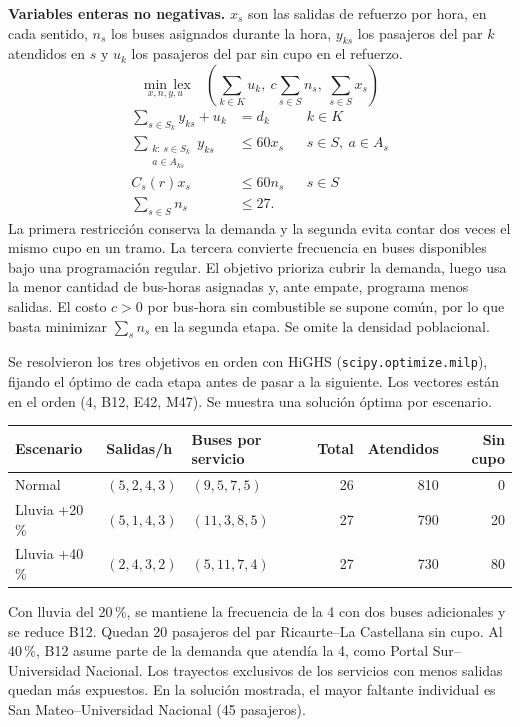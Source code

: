 \documentclass[11pt,letterpaper]{article}
\newcommand{\apartado}[1]{\par\vspace{3pt}{\sffamily\bfseries\color{azul}#1}\par\vspace{1pt}}
\begin{document}
\textbf{Variables enteras no negativas.} $x_s$ son las salidas de refuerzo por hora, en cada sentido, $n_s$ los buses asignados durante la hora, $y_{ks}$ los pasajeros del par $k$ atendidos en $s$ y $u_k$ los pasajeros del par sin cupo en el refuerzo.
\[
\underset{x,n,y,u}{\min\,\mathrm{lex}}\quad
\left(\sum_{k\in K} u_k,\ c\sum_{s\in S} n_s,\ \sum_{s\in S} x_s\right)
\]
\begin{align*}
\sum_{s\in S_k}y_{ks}+u_k &= d_k && k\in K\\
\sum_{\substack{k:\,s\in S_k\\ a\in A_{ks}}} y_{ks}&\le 60x_s && s\in S,\ a\in A_s\\
C_s(r)x_s&\le 60n_s &&s\in S\\
\sum_{s\in S} n_s&\le 27.
\end{align*}
La primera restricción conserva la demanda y la segunda evita contar dos veces el mismo cupo en un tramo. La tercera convierte frecuencia en buses disponibles bajo una programación regular. El objetivo prioriza cubrir la demanda, luego usa la menor cantidad de bus-horas asignadas y, ante empate, programa menos salidas. El costo $c>0$ por bus-hora sin combustible se supone común, por lo que basta minimizar $\sum_s n_s$ en la segunda etapa. Se omite la densidad poblacional.

\apartado{Solución y sensibilidad}
Se resolvieron los tres objetivos en orden con HiGHS (\texttt{scipy.optimize.milp}), fijando el óptimo de cada etapa antes de pasar a la siguiente. Los vectores están en el orden (4, B12, E42, M47). Se muestra una solución óptima por escenario.

\begin{center}\small
\begin{tabular}{@{}lllrrr@{}}
\toprule
\textbf{Escenario}&\textbf{Salidas/h}&\textbf{Buses por servicio}&\textbf{Total}&\textbf{Atendidos}&\textbf{Sin cupo}\\
\midrule
Normal & $(5,2,4,3)$ & $(9,5,7,5)$ &26&810&0\\
Lluvia +20\,\% & $(5,1,4,3)$ & $(11,3,8,5)$ &27&790&20\\
Lluvia +40\,\% & $(2,4,3,2)$ & $(5,11,7,4)$ &27&730&80\\
\bottomrule
\end{tabular}
\end{center}

Con lluvia del 20\,\%, se mantiene la frecuencia de la 4 con dos buses adicionales y se reduce B12. Quedan 20 pasajeros del par Ricaurte--La Castellana sin cupo. Al 40\,\%, B12 asume parte de la demanda que atendía la 4, como Portal Sur--Universidad Nacional. Los trayectos exclusivos de los servicios con menos salidas quedan más expuestos. En la solución mostrada, el mayor faltante individual es San Mateo--Universidad Nacional (45 pasajeros).
\end{document}
